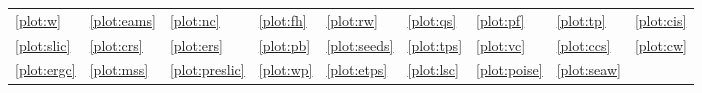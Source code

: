 	{\scriptsize
		\begin{tabularx}{\textwidth}{X X X X X X X X l}
			\ref{plot:w} \W &
			\ref{plot:eams} \EAMS &
			\ref{plot:nc} \NC &
			\ref{plot:fh} \FH &
			\ref{plot:rw} \RW &
			\ref{plot:qs} \QS &
			\ref{plot:pf} \PF &
			\ref{plot:tp} \TP &
			\ref{plot:cis} \CIS \\
			\ref{plot:slic} \SLIC &
			\ref{plot:crs} \CRS &
			\ref{plot:ers} \ERS &
			\ref{plot:pb} \PB &
			\ref{plot:seeds} \SEEDS &
			\ref{plot:tps} \TPS &
			\ref{plot:vc} \VC &
			\ref{plot:ccs} \CCS &
			\ref{plot:cw} \CW \\
			\ref{plot:ergc} \ERGC &
			\ref{plot:mss} \MSS &
			\ref{plot:preslic} \preSLIC &
			\ref{plot:wp} \WP &
			\ref{plot:etps} \ETPS &
			\ref{plot:lsc} \LSC &
			\ref{plot:poise} \POISE &
			\ref{plot:seaw} \SEAW &
		\end{tabularx}
	}
